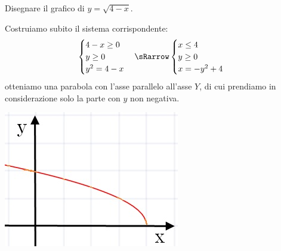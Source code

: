\begin{esempio} Disegnare il grafico di \( y=\sqrt{4-x} \).\\[7pt]
\begin{minipage}{.65\textwidth}
\noindent  Costruiamo subito il sistema 
corrispondente:
\[\begin{cases}  4-x\geq0   \\ y\geq0  \\y^{2}=4-x 
\end{cases} \sRarrow
\begin{cases}   x\leq4   \\ y\geq0  \\ x=-y^{2}+4 
\end{cases}\]
otteniamo una parabola con l'asse parallelo all'asse \(Y\), di cui 
prendiamo in considerazione solo la parte con \(y\) non negativa.
  \end{minipage} \hspace{.7cm}
  \begin{minipage}{.25\textwidth}
  \includegraphics[width=\textwidth]{img/curva3.jpg}
\end{minipage}
  \end{esempio}


